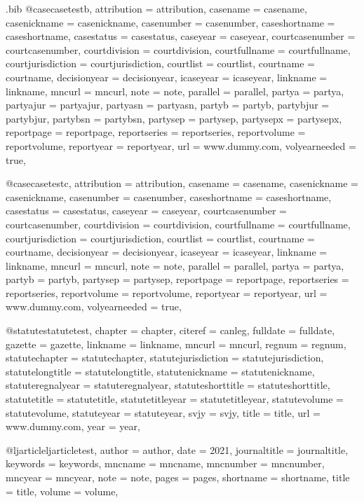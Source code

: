 \begin{filecontents*}[overwrite]{\jobname.bib}
@case{casetestb,
attribution = {attribution},
casename = {casename},
casenickname = {casenickname},
casenumber = {casenumber},
caseshortname = {caseshortname},
casestatus = {casestatus},
caseyear = {caseyear},
courtcasenumber = {courtcasenumber},
courtdivision = {courtdivision},
courtfullname = {courtfullname},
courtjurisdiction = {courtjurisdiction},
courtlist = {courtlist},
courtname = {courtname},
decisionyear = {decisionyear},
icaseyear = {icaseyear},
linkname = {linkname},
mncurl = {mncurl},
note = {note},
parallel = {parallel},
partya = {partya},
partyajur = {partyajur},
partyasn = {partyasn},
partyb = {partyb},
partybjur = {partybjur},
partybsn = {partybsn},
partysep = {partysep},
partysepx = {partysepx},
reportpage = {reportpage},
reportseries = {reportseries},
reportvolume = {reportvolume},
reportyear = {reportyear},
url = {www.dummy.com},
volyearneeded = {true},
}

@case{casetestc,
attribution = {attribution},
casename = {casename},
casenickname = {casenickname},
casenumber = {casenumber},
caseshortname = {caseshortname},
casestatus = {casestatus},
caseyear = {caseyear},
courtcasenumber = {courtcasenumber},
courtdivision = {courtdivision},
courtfullname = {courtfullname},
courtjurisdiction = {courtjurisdiction},
courtlist = {courtlist},
courtname = {courtname},
decisionyear = {decisionyear},
icaseyear = {icaseyear},
linkname = {linkname},
mncurl = {mncurl},
note = {note},
parallel = {parallel},
partya = {partya},
partyb = {partyb},
partysep = {partysep},
reportpage = {reportpage},
reportseries = {reportseries},
reportvolume = {reportvolume},
reportyear = {reportyear},
url = {www.dummy.com},
volyearneeded = {true},
}

@statute{statutetest,
chapter = {chapter},
citeref = {canleg},%
fulldate = {fulldate},
gazette = {gazette},
linkname = {linkname},
mncurl = {mncurl},
regnum = {regnum},
statutechapter = {statutechapter},
statutejurisdiction = {statutejurisdiction},
statutelongtitle = {statutelongtitle},
statutenickname = {statutenickname},
statuteregnalyear = {statuteregnalyear},
statuteshorttitle = {statuteshorttitle},
statutetitle = {statutetitle},
statutetitleyear = {statutetitleyear},
statutevolume = {statutevolume},
statuteyear = {statuteyear},
svjy = {svjy},
title = {title},
url = {www.dummy.com},
year = {year},
}

@ljarticle{ljarticletest,
author = {author},
date = {2021},
journaltitle = {journaltitle},
keywords = {keywords},
mncname = {mncname},
mncnumber = {mncnumber},
mncyear = {mncyear},
note = {note},
pages = {pages},
shortname = {shortname},
title = {title},
volume = {volume},
}


\end{filecontents*}
